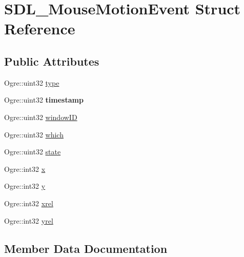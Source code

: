 \hypertarget{struct_s_d_l___mouse_motion_event}{}\section{S\+D\+L\+\_\+\+Mouse\+Motion\+Event Struct Reference}
\label{struct_s_d_l___mouse_motion_event}
\subsection*{Public Attributes}
\begin{DoxyCompactItemize}
\item 
Ogre\+::uint32 \hyperlink{struct_s_d_l___mouse_motion_event_ac30d623604135636e379662a8ea115d7}{type}
\item 
\mbox{\label{struct_s_d_l___mouse_motion_event_ade9bf8f0c9e162fc861b042661605783}} 
Ogre\+::uint32 {\bfseries timestamp}
\item 
Ogre\+::uint32 \hyperlink{struct_s_d_l___mouse_motion_event_ab56f333f28371a1a2ffcd160e0c87300}{window\+ID}
\item 
Ogre\+::uint32 \hyperlink{struct_s_d_l___mouse_motion_event_aba74dc264ec2e1617a5e20a5bbd6c097}{which}
\item 
Ogre\+::uint32 \hyperlink{struct_s_d_l___mouse_motion_event_a46f6986f4887a932f6e5fc0318e757df}{state}
\item 
Ogre\+::int32 \hyperlink{struct_s_d_l___mouse_motion_event_afb63357ab79b97c5177f698f98361bd5}{x}
\item 
Ogre\+::int32 \hyperlink{struct_s_d_l___mouse_motion_event_a5ec63d6686b27a2feb8f95073e4a4ad2}{y}
\item 
Ogre\+::int32 \hyperlink{struct_s_d_l___mouse_motion_event_a09f6ff4e8be12239421d5d2d279cb5f1}{xrel}
\item 
Ogre\+::int32 \hyperlink{struct_s_d_l___mouse_motion_event_a3e0fa5c6ad5bf75518caff81f984aed3}{yrel}
\end{DoxyCompactItemize}


\subsection{Member Data Documentation}
\mbox{\label{struct_s_d_l___mouse_motion_event_a46f6986f4887a932f6e5fc0318e757df}} 
